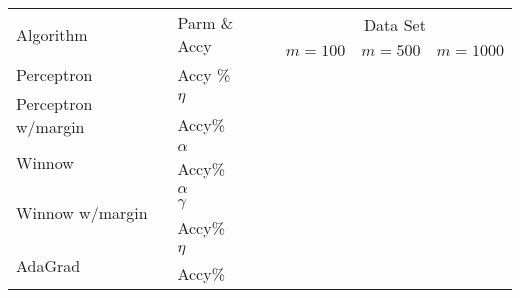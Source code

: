       \begin{center}
  \begin{table}
    \begin{tabular}{|p{4.3cm}<{\centering}|p{2.5cm}<{\centering}|p{2.7cm}<{\centering}|p{2.7cm}<{\centering}|p{2.7cm}<{\centering}|}
      \hline
      \multirow{2}{*}{Algorithm} & \multirow{2}{*}{Parm \& Accy} & \multicolumn{3}{|c|}{Data Set} \\
      \cline{3-5}
 & & $m=100$& $m=500$& $m=1000$\\
 \hline
      Perceptron    & Accy \%               &                             &   &                               \\ \hline
      \multirow{2}{*}{Perceptron w/margin} &          $\eta$          &                   &     &                               \\
      \cline{2-5}
      & Accy\% &  & & \\ \hline \hline
      \multirow{2}{*}{Winnow}               &     $\alpha$           &                     &         &                           \\
      \cline{2-5}
      & Accy\% &  & & \\ \hline \hline
      \multirow{3}{*}{Winnow w/margin}     & $\alpha$&                                     &     &                \\
      \cline{2-5}
      & $\gamma$ &  & & \\
      \cline{2-5}
      & Accy\% &  & & \\ \hline \hline
      \multirow{2}{*}{AdaGrad}             & $\eta$&                                      &               &                     \\
      \cline{2-5}
      & Accy\% &  & & \\ \hline %
    \end{tabular}
    \end{table}
    \end{center}


